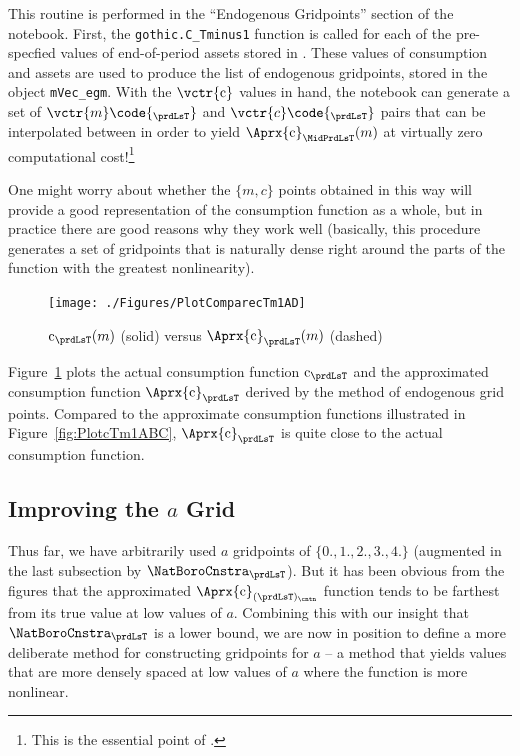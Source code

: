 \documentclass[titlepage, headings=optiontotocandhead]{econtex}
\begin{document}
This routine is performed in the ``Endogenous Gridpoints'' section of the notebook. First, the \texttt{gothic.C\_Tminus1} function is called for each of the pre-specfied values of end-of-period assets stored in . These values of consumption and assets are used to produce the list of endogenous gridpoints, stored in the object \texttt{mVec\_egm}. With the $\vctr{\mathrm{c}}$ values in hand, the notebook can generate a set of $\vctr{m}\code{_{\prdLsT}}$ and ${\vctr{c}\code{_{\prdLsT}}}$ pairs that can be interpolated between in order to yield $\Aprx{\mathrm{c}}_{\MidPrdLsT}(m)$ at virtually zero computational cost!\footnote{This is the essential point of \cite{carrollEGM}.} %

\hypertarget{PlotComparecTm1AD}{}
One might worry about whether the $\{{m},c\}$ points obtained in this way will provide a good representation of the consumption function as a whole, but in practice there are good reasons why they work well (basically, this procedure generates a set of gridpoints that is naturally dense right around the parts of the function with the greatest nonlinearity).
\begin{figure}
  \centerline{\texttt{[image: ./Figures/PlotComparecTm1AD]}}
  \caption{$\mathrm{c}_{\prdLsT}(m)$ (solid) versus $\Aprx{\mathrm{c}}_{\prdLsT}(m)$ (dashed)}
  \label{fig:ComparecTm1AD}
\end{figure}
Figure~\ref{fig:ComparecTm1AD} plots the actual consumption function $\mathrm{c}_{\prdLsT}$ and the approximated consumption function $\Aprx{\mathrm{c}}_{\prdLsT}$ derived by the method of endogenous grid points. Compared to the approximate consumption functions illustrated in Figure~\ref{fig:PlotcTm1ABC}, $\Aprx{\mathrm{c}}_{\prdLsT}$ is quite close to the actual consumption function.



\hypertarget{improving-the-a-grid}{}
\subsection{Improving the $a$ Grid}\label{subsec:improving-the-a-grid}

Thus far, we have arbitrarily used $a$ gridpoints of $\{0.,1.,2.,3.,4.\}$ (augmented in the last subsection by $\NatBoroCnstra_{\prdLsT}$).  But it has been obvious from the figures that the approximated $\Aprx{\mathrm{c}}_{(\prdLsT)_\cntn}$ function tends to be farthest from its true value at low values of $a$.  Combining this with our insight that $\NatBoroCnstra_{\prdLsT}$ is a lower bound, we are now in position to define a more deliberate method for constructing gridpoints for $a$ -- a method that yields values that are more densely spaced at low values of $a$ where the function is more nonlinear.
\end{document}
